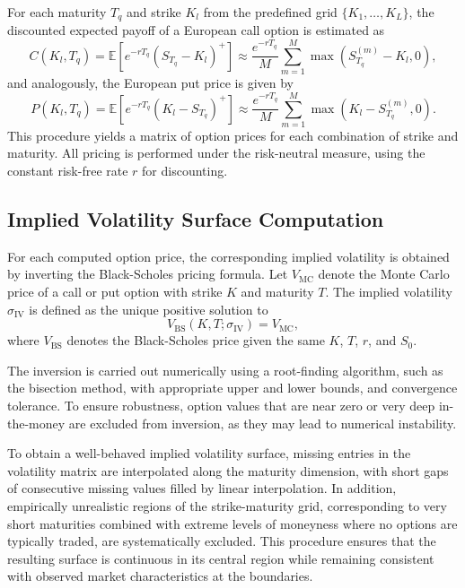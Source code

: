 For each maturity $T_q$ and strike $K_l$ from the predefined grid $\{K_1,\ldots,K_L\}$, the discounted expected payoff of a European call option is estimated as
\begin{equation}
    C(K_l, T_q) = \mathbb{E}\left[ e^{-rT_q} (S_{T_q} - K_l)^+ \right] \approx \frac{e^{-rT_q}}{M} \sum_{m=1}^M \max\left(S_{T_q}^{(m)} - K_l, 0\right),
\end{equation}
and analogously, the European put price is given by
\begin{equation}
    P(K_l, T_q) = \mathbb{E}\left[ e^{-rT_q} (K_l - S_{T_q})^+ \right] \approx \frac{e^{-rT_q}}{M} \sum_{m=1}^M \max\left(K_l - S_{T_q}^{(m)}, 0\right).
\end{equation}
This procedure yields a matrix of option prices for each combination of strike and maturity. All pricing is performed under the risk-neutral measure, using the constant risk-free rate $r$ for discounting.


\subsection{Implied Volatility Surface Computation} \label{subsec:ImpliedVolaSurfaceComputation}

For each computed option price, the corresponding implied volatility is obtained by inverting the Black-Scholes pricing formula. Let $V_{\text{MC}}$ denote the Monte Carlo price of a call or put option with strike $K$ and maturity $T$. The implied volatility $\sigma_{\text{IV}}$ is defined as the unique positive solution to
\begin{equation}
    V_{\text{BS}}(K, T; \sigma_{\text{IV}}) = V_{\text{MC}},
\end{equation}
where $V_{\text{BS}}$ denotes the Black-Scholes price given the same $K$, $T$, $r$, and $S_0$.

The inversion is carried out numerically using a root-finding algorithm, such as the bisection method, with appropriate upper and lower bounds, and convergence tolerance. To ensure robustness, option values that are near zero or very deep in-the-money are excluded from inversion, as they may lead to numerical instability.

To obtain a well-behaved implied volatility surface, missing entries in the volatility matrix are interpolated along the maturity dimension, with short gaps of consecutive missing values filled by linear interpolation. In addition, empirically unrealistic regions of the strike-maturity grid, corresponding to very short maturities combined with extreme levels of moneyness where no options are typically traded, are systematically excluded. This procedure ensures that the resulting surface is continuous in its central region while remaining consistent with observed market characteristics at the boundaries.

